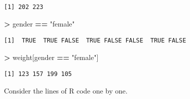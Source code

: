 \documentclass[]{krantz}
\makeatletter
\newenvironment{Shaded}{\begin{snugshade}}{\end{snugshade}}
\newcommand{\NormalTok}[1]{#1}
\newcommand{\OperatorTok}[1]{\textcolor[rgb]{0.43,0.43,0.43}{\textbf{#1}}}
\newcommand{\StringTok}[1]{\textcolor[rgb]{0.5,0.5,0.5}{#1}}
\newenvironment{kframe}{%
\medskip{}
\setlength{\fboxsep}{.8em}
 \def\at@end@of@kframe{}%
 \ifinner\ifhmode%
  \def\at@end@of@kframe{\end{minipage}}%
  \begin{minipage}{\columnwidth}%
 \fi\fi%
 \def\FrameCommand##1{\hskip\@totalleftmargin \hskip-\fboxsep
 \colorbox{shadecolor}{##1}\hskip-\fboxsep
     \hskip-\linewidth \hskip-\@totalleftmargin \hskip\columnwidth}%
 \MakeFramed {\advance\hsize-\width
   \@totalleftmargin\z@ \linewidth\hsize
   \@setminipage}}%
 {\par\unskip\endMakeFramed%
 \at@end@of@kframe}
\renewenvironment{Shaded}{\begin{kframe}}{\end{kframe}}
\makeatother
\begin{document}
\begin{verbatim}
[1] 202 223
\end{verbatim}

\begin{Shaded}
\begin{Highlighting}[]
\OperatorTok{>}\StringTok{ }\NormalTok{gender }\OperatorTok{==}\StringTok{ "female"}
\end{Highlighting}
\end{Shaded}

\begin{verbatim}
[1]  TRUE  TRUE FALSE  TRUE FALSE FALSE  TRUE FALSE
\end{verbatim}

\begin{Shaded}
\begin{Highlighting}[]
\OperatorTok{>}\StringTok{ }\NormalTok{weight[gender }\OperatorTok{==}\StringTok{ "female"}\NormalTok{]}
\end{Highlighting}
\end{Shaded}

\begin{verbatim}
[1] 123 157 199 105
\end{verbatim}

Consider the lines of R code one by one.
\end{document}
